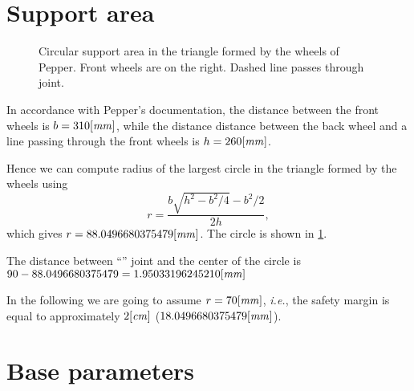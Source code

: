 \section{Support area}

\begin{figure}[!ht]
    \caption{Circular support area in the triangle formed by the wheels of
    Pepper. Front wheels are on the right. Dashed line passes through
     joint.}
    \label{fig-support-area}
\end{figure}

In accordance with Pepper's documentation, the distance between the front
wheels is $b = 310 \mathit{[mm]}$, while the distance distance between the back
wheel and a line passing through the front wheels is $h = 260 \mathit{[mm]}$.

Hence we can compute radius of the largest circle in the triangle formed by the
wheels using
%
\begin{equation}
    r = \frac{b\sqrt{h^2 - b^2/4} - b^2/2}{2h},
\end{equation}
%
which gives $r = 88.0496680375479 \mathit{[mm]}$. The circle is shown in
\cref{fig-support-area}.

The distance between ``'' joint and the center of the circle is
$90 - 88.0496680375479 = 1.95033196245210 \mathit{[mm]}$

In the following we are going to assume $r = 70 \mathit{[mm]}$, \emph{i.e.}, the
safety margin is equal to approximately $2 \mathit{[cm]}$ ($18.0496680375479
\mathit{[mm]}$).


\section{Base parameters}

